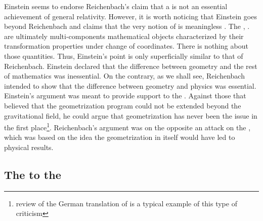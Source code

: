 \documentclass[final]{article}
\newcommand{\PRZL}{\citetitle{Reichenbach1928}\xspace}
\begin{document}
Einstein seems to endorse Reichenbach's claim that a  is not an essential achievement of general relativity. However, it is worth noticing that Einstein goes beyond Reichenbach and claims that the very notion of  is meaningless \citep{Lehmkuhl2014}. The \gmn, \Gtmn\etc. are ultimately multi-components mathematical objects characterized by their transformation properties under change of coordinates. There is nothing  about those quantities. Thus, Einstein's point is only superficially similar to that of Reichenbach. Einstein declared that the difference between geometry and the rest of mathematics was inessential. On the contrary, as we shall see, Reichenbach intended to show that the difference between geometry and physics was essential. Einstein's argument was meant to provide support to the \uftp. Against those that believed that the geometrization program could not be extended beyond the gravitational field, he could argue that geometrization has never been the issue in the first place\footnote{ review of the German translation of \citet{Eddington1925} is a typical example of this type of criticism}. Reichenbach's argument was on the opposite an attack on the \uftp, which was based on the idea the geometrization in itself would have led to physical results.


\subsection{The \Ap to the \PRZL}
\end{document}
